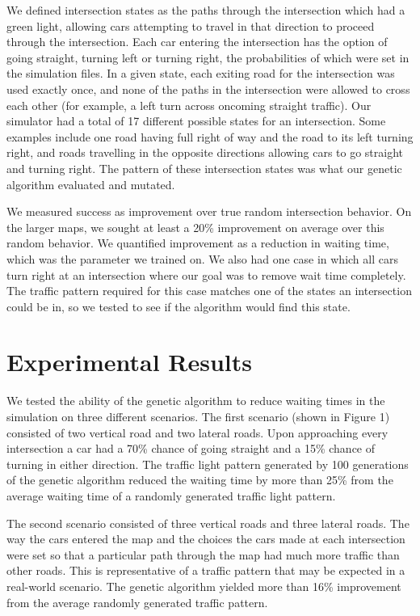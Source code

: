 \documentclass[12pt, letterpaper]{article}
\begin{document}
We defined intersection states as the paths through the intersection which had a green light, allowing cars attempting to travel in that direction to proceed through the intersection.
Each car entering the intersection has the option of going straight, turning left or turning right, the probabilities of which were set in the simulation files.
In a given state, each exiting road for the intersection was used exactly once, and none of the paths in the intersection were allowed to cross each other (for example, a left turn across oncoming straight traffic).
Our simulator had a total of 17 different possible states for an intersection.
Some examples include one road having full right of way and the road to its left turning right, and roads travelling in the opposite directions allowing cars to go straight and turning right.
The pattern of these intersection states was what our genetic algorithm evaluated and mutated.

We measured success as improvement over true random intersection behavior.
On the larger maps, we sought at least a 20\% improvement on average over this random behavior.
We quantified improvement as a reduction in waiting time, which was the parameter we trained on.
We also had one case in which all cars turn right at an intersection where our goal was to remove wait time completely.
The traffic pattern required for this case matches one of the states an intersection could be in, so we tested to see if the algorithm would find this state.


\section*{Experimental Results}

We tested the ability of the genetic algorithm to reduce waiting times in the simulation on three different scenarios. 
The first scenario (shown in Figure 1) consisted of two vertical road and two lateral roads. 
Upon approaching every intersection a car had a 70\% chance of going straight and a 15\% chance of turning in either direction. 
The traffic light pattern generated by 100 generations of the genetic algorithm reduced the waiting time by more than 25\% from the average waiting time of a randomly generated traffic light pattern. 

The second scenario consisted of three vertical roads and three lateral roads. 
The way the cars entered the map and the choices the cars made at each intersection were set so that a particular path through the map had much more traffic than other roads. 
This is representative of a traffic pattern that may be expected in a real-world scenario. 
The genetic algorithm yielded more than 16\% improvement from the average randomly generated traffic pattern. 
\end{document}
